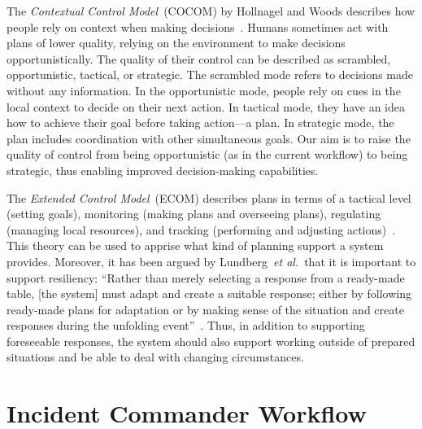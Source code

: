 \documentclass{egpubl}
\def\etal{\textit{et al.}}
\begin{document}
The \emph{Contextual Control Model}~(COCOM) by Hollnagel and Woods describes how people rely on context when making decisions~\cite{hollnagel2005joint}. Humans sometimes act with plans of lower quality, relying on the environment to make decisions opportunistically. The quality of their control can be described as scrambled, opportunistic, tactical, or strategic. The scrambled mode refers to decisions made without any information. In the opportunistic mode, people rely on cues in the local context to decide on their next action. In tactical mode, they have an idea how to achieve their goal before taking action---a plan. In strategic mode, the plan includes coordination with other simultaneous goals. Our aim is to raise the quality of control from being opportunistic (as in the current workflow) to being strategic, thus enabling improved decision-making capabilities.

The \emph{Extended Control Model}~(ECOM) describes plans in terms of a tactical level (setting goals), monitoring (making plans and overseeing plans), regulating (managing local resources), and tracking (performing and adjusting actions)~\cite{hollnagel2005joint}. This theory can be used to apprise what kind of planning support a system provides.  Moreover, it has been argued by Lundberg~\etal\ that it is important to support resiliency: ``Rather than merely selecting a response from a ready-made table, [the system] must adapt and create a suitable response; either by following ready-made plans for adaptation or by making sense of the situation and create responses during the unfolding event''~\cite{Lundberg2012}. Thus, in addition to supporting foreseeable responses, the system should also support working outside of prepared situations and be able to deal with changing circumstances.


\section{Incident Commander Workflow} \label{sec:workflow}
\end{document}
